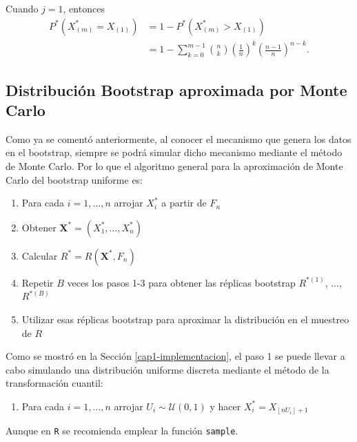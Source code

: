 \documentclass[]{book}
\providecommand{\tightlist}{%
  \setlength{\itemsep}{0pt}\setlength{\parskip}{0pt}}
\theoremstyle{definition}
\theoremstyle{definition}
\theoremstyle{definition}
\theoremstyle{remark}
\begin{document}
Cuando \(j=1\), entonces \[\begin{aligned}
P^{\ast}\left( X_{(m)}^{\ast} = X_{(1)} \right)
&= 1-P^{\ast}\left( X_{(m)}^{\ast}>X_{(1)} \right) \\
&=  1-\sum_{k=0}^{m-1}\binom{n}{k}\left( \frac{1}{n} \right)^{k}
\left( \frac{n-1}{n} \right)^{n-k}.
\end{aligned}\]

\subsection{Distribución Bootstrap aproximada por Monte
Carlo}\label{distribucion-bootstrap-aproximada-por-monte-carlo}

Como ya se comentó anteriormente, al conocer el mecanismo que genera los
datos en el bootstrap, siempre se podrá simular dicho mecanismo mediante
el método de Monte Carlo. Por lo que el algoritmo general para la
aproximación de Monte Carlo del bootstrap uniforme es:

\begin{enumerate}
\def\labelenumi{\arabic{enumi}.}
\item
  Para cada \(i=1,\ldots ,n\) arrojar \(X_i^{\ast}\) a partir de \(F_n\)
\item
  Obtener
  \(\mathbf{X}^{\ast}=\left( X_1^{\ast},\ldots ,X_n^{\ast} \right)\)
\item
  Calcular \(R^{\ast}=R\left( \mathbf{X}^{\ast},F_n \right)\)
\item
  Repetir \(B\) veces los pasos 1-3 para obtener las réplicas bootstrap
  \(R^{\ast (1)}\), \(\ldots\), \(R^{\ast (B)}\)
\item
  Utilizar esas réplicas bootstrap para aproximar la distribución en el
  muestreo de \(R\)
\end{enumerate}

Como se mostró en la Sección \ref{cap1-implementacion}, el paso 1 se
puede llevar a cabo simulando una distribución uniforme discreta
mediante el método de la transformación cuantil:

\begin{enumerate}
\def\labelenumi{\arabic{enumi}.}
\tightlist
\item
  Para cada \(i=1,\ldots ,n\) arrojar
  \(U_i\sim \mathcal{U}\left( 0,1 \right)\) y hacer
  \(X_i^{\ast}=X_{\left\lfloor nU_i\right\rfloor +1}\)
\end{enumerate}

Aunque en \texttt{R} se recomienda emplear la función \texttt{sample}.
\end{document}
